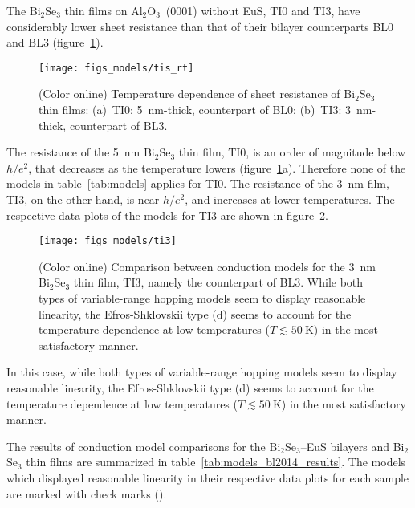 The Bi$_2$Se$_3$ thin films on Al$_2$O$_3$~(0001) without EuS, TI0 and TI3, have considerably lower sheet resistance than that of their bilayer counterparts BL0 and BL3 (figure~\ref{fig:models_tis_rt}).%
\begin{figure}[ht]%
    \centering%
    \texttt{[image: figs\_models/tis\_rt]}%
    \caption[Temperature dependence of sheet resistance of Bi$_2$Se$_3$ thin films: TI0~\&~TI3]{\label{fig:models_tis_rt}(Color online) Temperature dependence of sheet resistance of Bi$_2$Se$_3$ thin films: (a)~TI0: \SI{5}{nm}-thick, counterpart of BL0; (b)~TI3: \SI{3}{nm}-thick, counterpart of BL3.}%
\end{figure} %
%
The resistance of the \SI{5}{nm} Bi$_2$Se$_3$ thin film, TI0, is an order of magnitude below $h/e^2$, that decreases as the temperature lowers (figure~\ref{fig:models_tis_rt}a). Therefore none of the models in table~\ref{tab:models} applies for TI0. The resistance of the \SI{3}{nm} film, TI3, on the other hand, is near $h/e^2$, and increases at lower temperatures. The respective data plots of the models for TI3 are shown in figure~\ref{fig:models_ti3}.%
\begin{figure}[ht]%
    \centering%
    \texttt{[image: figs\_models/ti3]}%
    \caption[Conduction model comparison: Bi$_2$Se$_3$ thin film: TI3]{\label{fig:models_ti3}(Color online) Comparison between conduction models for the \SI{3}{nm} Bi$_2$Se$_3$ thin film, TI3, namely the counterpart of BL3. While both types of variable-range hopping models seem to display reasonable linearity, the Efros-Shklovskii type (d) seems to account for the temperature dependence at low temperatures ($T \lesssim 50~\mathrm{K}$) in the most satisfactory manner.}%
\end{figure} %
%
In this case, while both types of variable-range hopping models seem to display reasonable linearity, the Efros-Shklovskii type (d) seems to account for the temperature dependence at low temperatures ($T \lesssim 50~\mathrm{K}$) in the most satisfactory manner.

The results of conduction model comparisons for the Bi$_2$Se$_3$--EuS bilayers and Bi$_2$Se$_3$ thin films are summarized in table~\ref{tab:models_bl2014_results}. The models which displayed reasonable linearity in their respective data plots for each sample are marked with check marks (\checkmark).

